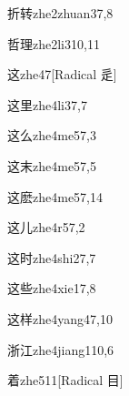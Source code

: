 \begin{verbete}{折转}{zhe2zhuan3}{7,8}
\end{verbete}

\begin{verbete}{哲理}{zhe2li3}{10,11}
\end{verbete}

\begin{verbete}{这}{zhe4}{7}[Radical 辵]
\end{verbete}

\begin{verbete}{这里}{zhe4li3}{7,7}
\end{verbete}

\begin{verbete}{这么}{zhe4me5}{7,3}
\end{verbete}

\begin{verbete}{这末}{zhe4me5}{7,5}
\end{verbete}

\begin{verbete}{这麽}{zhe4me5}{7,14}
\end{verbete}

\begin{verbete}{这儿}{zhe4r5}{7,2}
\end{verbete}

\begin{verbete}{这时}{zhe4shi2}{7,7}
\end{verbete}

\begin{verbete}{这些}{zhe4xie1}{7,8}
\end{verbete}

\begin{verbete}{这样}{zhe4yang4}{7,10}
\end{verbete}

\begin{verbete}{浙江}{zhe4jiang1}{10,6}
\end{verbete}

\begin{verbete}{着}{zhe5}{11}[Radical 目]
\end{verbete}

